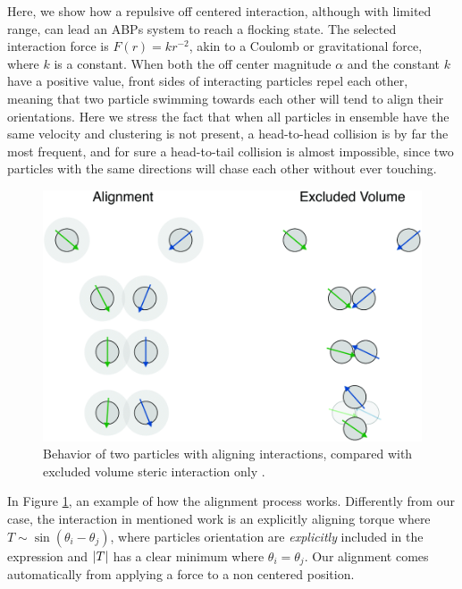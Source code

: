 \documentclass[../../master_thesis_np.tex]{subfiles}
\begin{document}
		Here, we show how a repulsive off centered interaction, although with limited range, can lead an ABPs system to reach a flocking state. 
		The selected interaction force is $F(r) = kr^{-2}$, akin to a Coulomb or gravitational force, where $k$ is a constant. 
		When both the off center magnitude $\alpha$ and the constant $k$ have a positive value, front sides of interacting particles repel each other, meaning that two particle swimming towards each other will tend to align their orientations. 
		Here we stress the fact that when all particles in ensemble have the same velocity and clustering is not present, a head-to-head collision is by far the most frequent, and for sure a head-to-tail collision is almost impossible, since two particles with the same directions will chase each other without ever touching.
		
		\begin{figure}[htp]
			\centering
			\includegraphics[width=\textwidth]{alignment.png}
			\caption{Behavior of two particles with aligning interactions, compared with excluded volume steric interaction only \citeauthor{martin-gomez_collective_2018}.}
			\label{fig:alignment}
		\end{figure}
		
		In Figure \ref{fig:alignment}, an example of how the alignment process works. 
		Differently from our case, the interaction in mentioned work is an explicitly aligning torque where $T \sim \sin( \theta_{i}-\theta_{j} )$, where particles orientation are \emph{explicitly} included in the expression and $\abs{T}$ has a clear minimum where $\theta_{i} = \theta_{j}$. 
		Our alignment comes automatically from applying a force to a non centered position. 
		
\end{document}
